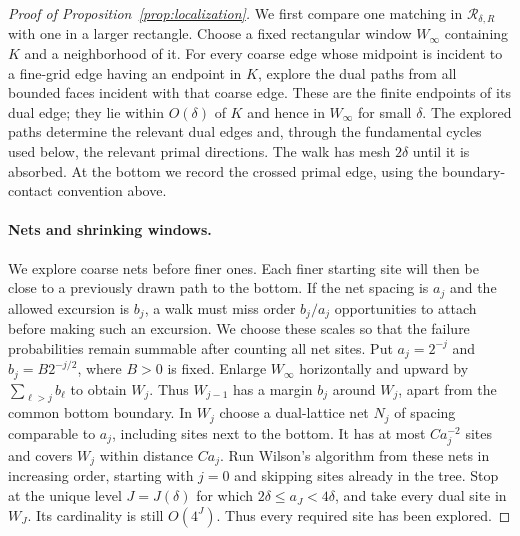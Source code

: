 \begin{proof}[Proof of Proposition~\ref{prop:localization}]
We first compare one matching in $\mathcal R_{\delta,R}$ with one in a
larger rectangle.  Choose a fixed rectangular window $W_\infty$ containing
$K$ and a neighborhood of it. For every coarse edge whose midpoint is
incident to a fine-grid edge having an endpoint in $K$, explore the
dual paths from all bounded faces incident with that coarse edge.
These are the finite endpoints of its dual edge; they lie within
$O(\delta)$ of $K$ and hence in $W_\infty$ for small $\delta$.
The explored paths determine the relevant dual edges and, through the
fundamental cycles used below, the relevant primal directions.
The walk has mesh $2\delta$ until it is absorbed. At the bottom we
record the crossed primal edge, using the boundary-contact convention
above.

\paragraph{Nets and shrinking windows.}
We explore coarse nets before finer ones. Each finer starting site
will then be close to a previously drawn path to the bottom. If the
net spacing is $a_j$ and the allowed excursion is $b_j$, a walk must
miss order $b_j/a_j$ opportunities to attach before making such an
excursion. We choose these scales so that the failure probabilities
remain summable after counting all net sites.
Put $a_j=2^{-j}$ and $b_j=B2^{-j/2}$, where $B>0$ is fixed.  Enlarge
$W_\infty$ horizontally and upward by $\sum_{\ell>j}b_\ell$ to obtain
$W_j$.  Thus $W_{j-1}$ has a margin $b_j$ around $W_j$, apart from the
common bottom boundary.  In $W_j$ choose a dual-lattice net $N_j$ of
spacing comparable to $a_j$, including sites next to the bottom.  It
has at most $Ca_j^{-2}$ sites and covers $W_j$ within distance $Ca_j$.
Run Wilson's algorithm from these nets in increasing order, starting
with $j=0$ and skipping sites already in the tree.  Stop at the unique
level $J=J(\delta)$ for which $2\delta\le a_J<4\delta$, and take every
dual site in $W_J$.  Its cardinality is still $O(4^J)$.  Thus every
required site has been explored.


\end{proof}

